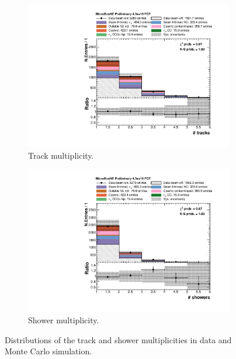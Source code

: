 \begin{figure}[htbp]
\centering
  \begin{subfigure}{0.49\textwidth}
    \includegraphics[width=\linewidth]{figures/n_tracks.pdf}
    \caption{Track multiplicity.} 
  \end{subfigure}\hfill
    \begin{subfigure}{0.49\textwidth}
    \includegraphics[width=\linewidth]{figures/n_showers.pdf}
    \caption{Shower multiplicity.} 
  \end{subfigure}
  \caption{Distributions of the track and shower multiplicities in data and Monte Carlo simulation.}\label{fig:multiplicity}
\end{figure}

